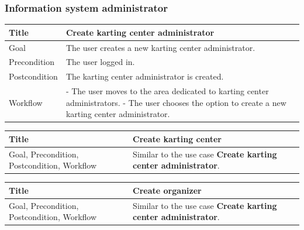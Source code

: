 \documentclass{beamer}
\begin{document}
\begin{frame}
    \frametitle{Information system administrator}
    \begin{table}
        \tiny
        \begin{tabular}{|p{2cm}|p{6cm}|}
        \hline  
        Title & \textbf{Create karting center administrator} \\
        \hline  
        Goal & The user creates a new karting center administrator. \\
        \hline
        Precondition & The user logged in. \\
        \hline
        Postcondition & The karting center administrator is created. \\
        \hline
        Workflow &
        - The user moves to the area dedicated to karting center administrators. \newline
        - The user chooses the option to create a new karting center administrator. \\
        \hline
        \end{tabular}
\end{table}

\begin{table}
    \tiny
    \begin{tabular}{|p{2cm}|p{6cm}|}
    \hline  
    Title & \textbf{Create karting center} \\
    \hline
    Goal, Precondition, Postcondition, Workflow & Similar 
    to the use case \textbf{Create karting center administrator}. \\
    \hline
    \end{tabular}
\end{table}

\begin{table}
    \tiny
    \begin{tabular}{|p{2cm}|p{6cm}|}
    \hline  
        Title & \textbf{Create organizer} \\
        \hline
        Goal, Precondition, Postcondition, Workflow & Similar 
        to the use case \textbf{Create karting center administrator}. \\
        \hline
        \end{tabular}
\end{table}

\end{frame}
\end{document}

